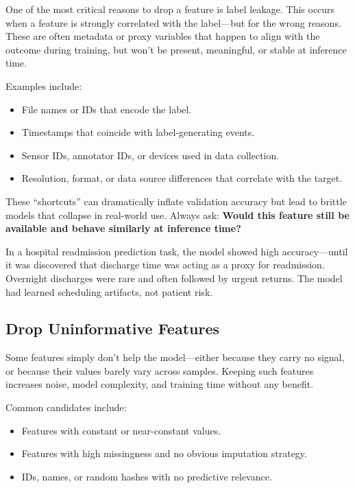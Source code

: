 \documentclass[12pt,openany, draft]{book}
\begin{document}
One of the most critical reasons to drop a feature is label leakage. This occurs when a feature is strongly correlated with the label—but for the wrong reasons. These are often metadata or proxy variables that happen to align with the outcome during training, but won’t be present, meaningful, or stable at inference time.

Examples include:
\begin{itemize}
    \item File names or IDs that encode the label.
    \item Timestamps that coincide with label-generating events.
    \item Sensor IDs, annotator IDs, or devices used in data collection.
    \item Resolution, format, or data source differences that correlate with the target.
\end{itemize}

These “shortcuts” can dramatically inflate validation accuracy but lead to brittle models that collapse in real-world use. Always ask: \textbf{Would this feature still be available and behave similarly at inference time?}

\noindent\begin{minipage}{\textwidth}
\begin{examplebox}
In a hospital readmission prediction task, the model showed high accuracy—until it was discovered that discharge time was acting as a proxy for readmission. Overnight discharges were rare and often followed by urgent returns. The model had learned scheduling artifacts, not patient risk.
\end{examplebox}
\end{minipage}


\subsection{Drop Uninformative Features}

Some features simply don’t help the model—either because they carry no signal, or because their values barely vary across samples. Keeping such features increases noise, model complexity, and training time without any benefit.

Common candidates include:
\begin{itemize}
    \item Features with constant or near-constant values.
    \item Features with high missingness and no obvious imputation strategy.
    \item IDs, names, or random hashes with no predictive relevance.
\end{itemize}
\end{document}
